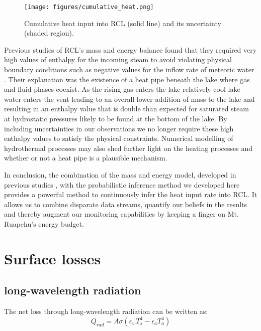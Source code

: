 \documentclass{bmcart}
\begin{document}
\begin{figure}
    \texttt{[image: figures/cumulative\_heat.png]}
    \caption{Cumulative heat input into RCL (solid line) and its 
    uncertainty (shaded region).}
    \label{cumheat}
\end{figure}

Previous studies of RCL's mass and energy balance found that they required very
high values of enthalpy for the incoming steam to avoid violating physical
boundary conditions such as negative values for the inflow rate of meteoric
water \cite{hurstCraterLakeEnergy2015, Stevenson1992}. Their explanation was the
existence of a heat pipe beneath the lake where gas and fluid phases coexist. As
the rising gas enters the lake relatively cool lake water enters the vent
leading to an overall lower addition of mass to the lake and resulting in an
enthalpy value that is double than expected for saturated steam at hydrostatic
pressures likely to be found at the bottom of the lake. By including
uncertainties in our observations we no longer require these high enthalpy
values to satisfy the physical constraints. Numerical modelling of hydrothermal
processes may also shed further light on the heating processes and whether or
not a heat pipe is a plausible mechanism.

In conclusion, the combination of the mass and energy model, developed in
previous studies \cite{hurstCraterLakeEnergy2015, Stevenson1992}, with the
probabilistic inference method we developed here provides a powerful method to
continuously infer the heat input rate into RCL. It allows us to combine
disparate data streams, quantify our beliefs in the results and thereby augment
our monitoring capabilities by keeping a finger on Mt. Ruapehu's energy budget.

\appendix
\section{Surface losses}\label{A}
\subsection{long-wavelength radiation}
The net loss through long-wavelength radiation can be written as:
\begin{equation}
    Q_{rad} = A\sigma(\epsilon_w T_s^4 - \epsilon_a T_a^4)
\end{equation}
\end{document}
